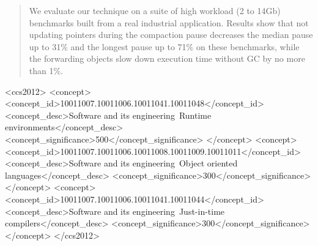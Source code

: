 \documentclass[sigplan,10pt,screen]{acmart}\settopmatter{printfolios=true,printccs=true,printacmref=true}
\def\bestMedian{31\%\xspace}
\def\bestWorst{71\%\xspace}
\begin{document}
\begin{abstract}
We evaluate our technique on a suite of high workload (2 to 14Gb) benchmarks built from a real industrial application. Results show that not updating pointers during the compaction pause decreases the median pause up to \bestMedian and the longest pause up to \bestWorst on these benchmarks, while the forwarding objects slow down execution time without GC by no more than 1\%.

\end{abstract}


\begin{CCSXML}
<ccs2012>
<concept>
<concept_id>10011007.10011006.10011041.10011048</concept_id>
<concept_desc>Software and its engineering~Runtime environments</concept_desc>
<concept_significance>500</concept_significance>
</concept>
<concept>
<concept_id>10011007.10011006.10011008.10011009.10011011</concept_id>
<concept_desc>Software and its engineering~Object oriented languages</concept_desc>
<concept_significance>300</concept_significance>
</concept>
<concept>
<concept_id>10011007.10011006.10011041.10011044</concept_id>
<concept_desc>Software and its engineering~Just-in-time compilers</concept_desc>
<concept_significance>300</concept_significance>
</concept>
</ccs2012>
\end{CCSXML}





\maketitle
\end{document}
